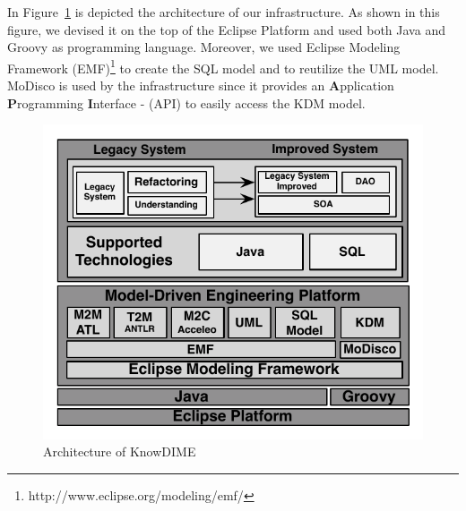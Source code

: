 
In Figure~\ref{fig:architecture} is depicted the architecture of our infrastructure. As shown in this figure, we devised it on the top of the Eclipse Platform and used both Java and Groovy as programming language. Moreover, we used Eclipse Modeling Framework (EMF)\footnote{http://www.eclipse.org/modeling/emf/} to create the SQL model and to reutilize the UML model. MoDisco is used by the infrastructure since it provides an
\textbf{A}pplication \textbf{P}rogramming \textbf{I}nterface - (API) to easily access the KDM model. 

\begin{figure}[!h]
\centering
 \includegraphics[scale=0.8]{Figuras/Arquitetura_da_Ferramenta}
\caption{Architecture of KnowDIME}
\label{fig:architecture}
\end{figure}




